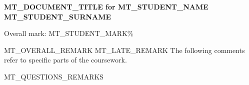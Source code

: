 \documentclass[fleqn,12pt]{article}
\begin{document}
\begin{center}
\Large{\textbf{MT_DOCUMENT_TITLE for MT_STUDENT_NAME MT_STUDENT_SURNAME}}
\end{center}

{\noindent}Overall mark: MT_STUDENT_MARK\%

\vspace*{10pt}
{\noindent}MT_OVERALL_REMARK MT_LATE_REMARK The following comments refer to specific parts of the coursework.

MT_QUESTIONS_REMARKS
\end{document}
